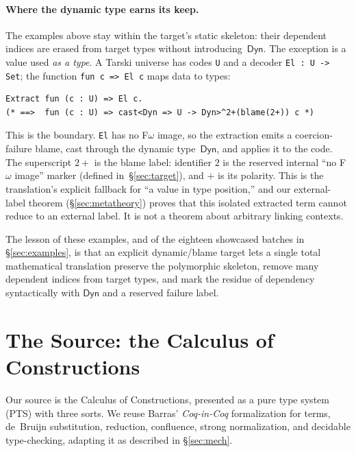 \documentclass[acmsmall,anonymous=false,nonacm]{acmart}
\newcommand{\dyn}{\ensuremath{\mathsf{Dyn}}}
\begin{document}
\paragraph{Where the dynamic type earns its keep.}
The examples above stay within the target's static skeleton: their dependent
indices are erased from target types without introducing~$\dyn$. The exception
is a value used \emph{as a
type}. A Tarski universe has codes \texttt{U} and a decoder \texttt{El : U ->
Set}; the function \texttt{fun c => El c} maps data to types:
\begin{lstlisting}
Extract fun (c : U) => El c.
(* ==>  fun (c : U) => cast<Dyn => U -> Dyn>^2+(blame(2+)) c *)
\end{lstlisting}
This is the boundary. \texttt{El} has no F$\omega$ image, so the extraction
emits a coercion-failure blame, cast through the dynamic type~$\dyn$, and
applies it to the code. The superscript $2{+}$ is the blame label: identifier
$2$ is the reserved internal ``no F$\omega$ image'' marker (defined
in~\S\ref{sec:target}), and $+$ is its polarity. This is the translation's
explicit fallback for ``a value in type position,'' and our external-label
theorem
(\S\ref{sec:metatheory}) proves that this isolated extracted term cannot reduce
to an external label. It is not a theorem about arbitrary linking contexts.

\medskip
The lesson of these examples, and of the eighteen showcased batches in
\S\ref{sec:examples}, is that an explicit dynamic/blame target lets a single
total mathematical translation preserve the polymorphic skeleton, remove many dependent indices from target
types, and mark the residue of dependency syntactically with $\dyn$ and a
reserved failure label.

\section{The Source: the Calculus of Constructions}\label{sec:source}

Our source is the Calculus of Constructions, presented as a pure type system
(PTS) \cite{barendregt1991lambda} with three sorts. We reuse Barras'
\emph{Coq-in-Coq} formalization \cite{barras1999} for terms, de~Bruijn
substitution, reduction, confluence, strong normalization, and decidable
type-checking, adapting it as described in \S\ref{sec:mech}.
\end{document}
